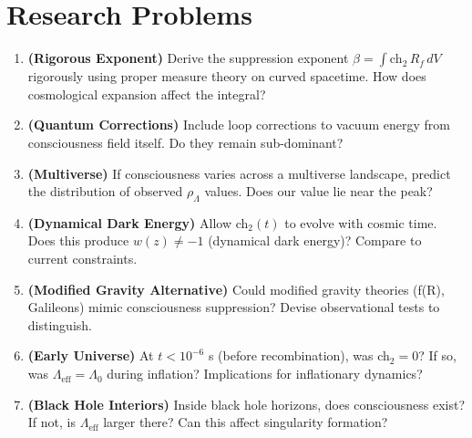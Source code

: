 \section*{Research Problems}

\begin{enumerate}
\item \textbf{(Rigorous Exponent)} Derive the suppression exponent $\beta = \int \text{ch}_2 \, R_f \, dV$ rigorously using proper measure theory on curved spacetime. How does cosmological expansion affect the integral?

\item \textbf{(Quantum Corrections)} Include loop corrections to vacuum energy from consciousness field itself. Do they remain sub-dominant?

\item \textbf{(Multiverse)} If consciousness varies across a multiverse landscape, predict the distribution of observed $\rho_\Lambda$ values. Does our value lie near the peak?

\item \textbf{(Dynamical Dark Energy)} Allow ch$_2(t)$ to evolve with cosmic time. Does this produce $w(z) \neq -1$ (dynamical dark energy)? Compare to current constraints.

\item \textbf{(Modified Gravity Alternative)} Could modified gravity theories (f(R), Galileons) mimic consciousness suppression? Devise observational tests to distinguish.

\item \textbf{(Early Universe)} At $t < 10^{-6}$ s (before recombination), was ch$_2 = 0$? If so, was $\Lambda_{\text{eff}} = \Lambda_0$ during inflation? Implications for inflationary dynamics?

\item \textbf{(Black Hole Interiors)} Inside black hole horizons, does consciousness exist? If not, is $\Lambda_{\text{eff}}$ larger there? Can this affect singularity formation?
\end{enumerate}
